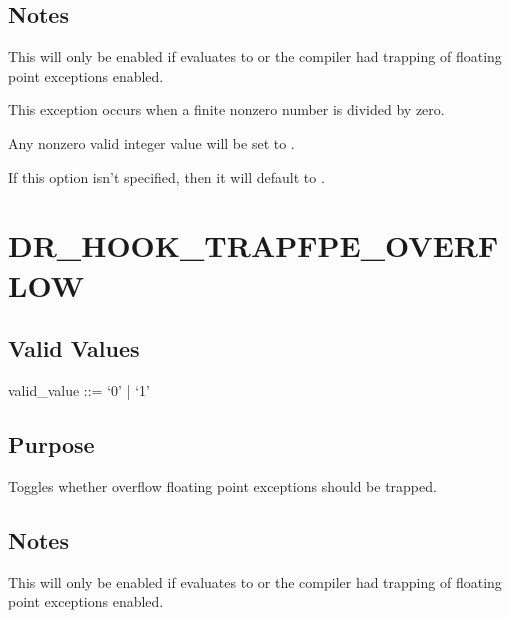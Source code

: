 \documentclass[letterpaper,10pt,english]{sphinxmanual}
\begin{document}
\subsection{Notes}
\label{\detokenize{flag/flag:id172}}
\sphinxAtStartPar
This will only be enabled if {\hyperref[\detokenize{flag/flag:dr-hook-trapfpe}]{}} evaluates to  or the compiler had trapping of floating point exceptions enabled.

\sphinxAtStartPar
This exception occurs when a finite nonzero number is divided by zero.

\sphinxAtStartPar
Any non\sphinxhyphen{}zero valid integer value will be set to .

\sphinxAtStartPar
If this option isn’t specified, then it will default to .


\section{DR\_HOOK\_TRAPFPE\_OVERFLOW}
\label{\detokenize{flag/flag:dr-hook-trapfpe-overflow}}\label{\detokenize{flag/flag:id174}}

\subsection{Valid Values}
\label{\detokenize{flag/flag:id175}}
\begin{DUlineblock}{0em}
\item[] valid\_value ::= ‘0’ | ‘1’
\end{DUlineblock}


\subsection{Purpose}
\label{\detokenize{flag/flag:id176}}
\sphinxAtStartPar
Toggles whether overflow floating point exceptions should be trapped.


\subsection{Notes}
\label{\detokenize{flag/flag:id177}}
\sphinxAtStartPar
This will only be enabled if {\hyperref[\detokenize{flag/flag:dr-hook-trapfpe}]{}} evaluates to  or the compiler had trapping of floating point exceptions enabled.
\end{document}
